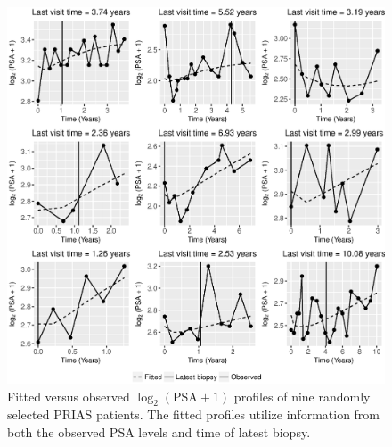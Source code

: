 \begin{enumerate}
        \clearpage
        \begin{figure}[!htb]
        \centerline{\includegraphics[width=\columnwidth]{../images/model_fit/fitted_log2psaplus1_9random_patients.eps}}
        \caption{Fitted versus observed $\log_2(\mbox{PSA}+1)$ profiles of nine randomly selected PRIAS patients. The fitted profiles utilize information from both the observed PSA levels and time of latest biopsy.}
        \label{fig : fitted_log2psaplus1_9random_patients}
        \end{figure}
        

\end{enumerate}
